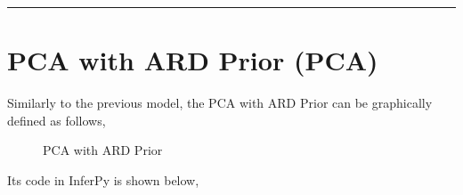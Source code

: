 \documentclass[letterpaper,10pt,english]{sphinxmanual}
\begin{document}
\bigskip\hrule\bigskip



\section{PCA with ARD Prior (PCA)}
\label{\detokenize{notes/probzoo:pca-with-ard-prior-pca}}
Similarly to the previous model, the PCA with ARD Prior can be graphically defined as follows,

\begin{figure}[htbp]
\centering
\capstart

\noindent{}
\caption{PCA with ARD Prior}\label{\detokenize{notes/probzoo:id6}}\end{figure}

Its code in InferPy is shown below,
\end{document}
